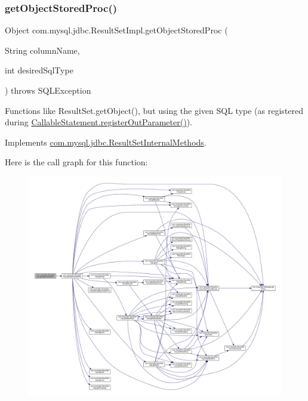 \subsubsection{\texorpdfstring{get\+Object\+Stored\+Proc()}{getObjectStoredProc()}\hspace{0.1cm}{\footnotesize\ttfamily [3/4]}}
{\footnotesize\ttfamily Object com.\+mysql.\+jdbc.\+Result\+Set\+Impl.\+get\+Object\+Stored\+Proc (\begin{DoxyParamCaption}\item[{String}]{column\+Name,  }\item[{int}]{desired\+Sql\+Type }\end{DoxyParamCaption}) throws S\+Q\+L\+Exception}

Functions like Result\+Set.\+get\+Object(), but using the given S\+QL type (as registered during \mbox{\hyperlink{classcom_1_1mysql_1_1jdbc_1_1_callable_statement_a5158af0506cf90040062b2049550f59b}{Callable\+Statement.\+register\+Out\+Parameter()}}). 

Implements \mbox{\hyperlink{interfacecom_1_1mysql_1_1jdbc_1_1_result_set_internal_methods_aa693d4e906617c6ef3be279b1416748b}{com.\+mysql.\+jdbc.\+Result\+Set\+Internal\+Methods}}.

Here is the call graph for this function\+:
\nopagebreak
\begin{figure}[H]
\begin{center}
\leavevmode
\includegraphics[width=350pt]{classcom_1_1mysql_1_1jdbc_1_1_result_set_impl_a3a52fc30cfaf7a73fca13e48bbc8a5d0_cgraph}
\end{center}
\end{figure}
\mbox{\label{classcom_1_1mysql_1_1jdbc_1_1_result_set_impl_a9d1a5e010a5b824c7c8019dea3ce23e9}} 
